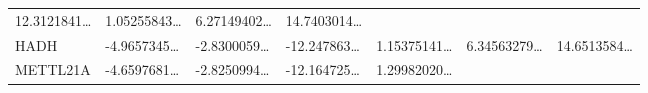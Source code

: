 \documentclass[
]{article}
\begin{document}
\begin{longtable}[]{@{}lllllll@{}}
\begin{minipage}[t]{0.12\columnwidth}
12.3121841\ldots{}\strut
\end{minipage} & \begin{minipage}[t]{0.12\columnwidth}\raggedright
1.05255843\ldots{}\strut
\end{minipage} & \begin{minipage}[t]{0.12\columnwidth}\raggedright
6.27149402\ldots{}\strut
\end{minipage} & \begin{minipage}[t]{0.12\columnwidth}\raggedright
14.7403014\ldots{}\strut
\end{minipage}\tabularnewline
\begin{minipage}[t]{0.08\columnwidth}\raggedright
HADH\strut
\end{minipage} & \begin{minipage}[t]{0.12\columnwidth}\raggedright
-4.9657345\ldots{}\strut
\end{minipage} & \begin{minipage}[t]{0.12\columnwidth}\raggedright
-2.8300059\ldots{}\strut
\end{minipage} & \begin{minipage}[t]{0.12\columnwidth}\raggedright
-12.247863\ldots{}\strut
\end{minipage} & \begin{minipage}[t]{0.12\columnwidth}\raggedright
1.15375141\ldots{}\strut
\end{minipage} & \begin{minipage}[t]{0.12\columnwidth}\raggedright
6.34563279\ldots{}\strut
\end{minipage} & \begin{minipage}[t]{0.12\columnwidth}\raggedright
14.6513584\ldots{}\strut
\end{minipage}\tabularnewline
\begin{minipage}[t]{0.08\columnwidth}\raggedright
METTL21A\strut
\end{minipage} & \begin{minipage}[t]{0.12\columnwidth}\raggedright
-4.6597681\ldots{}\strut
\end{minipage} & \begin{minipage}[t]{0.12\columnwidth}\raggedright
-2.8250994\ldots{}\strut
\end{minipage} & \begin{minipage}[t]{0.12\columnwidth}\raggedright
-12.164725\ldots{}\strut
\end{minipage} & \begin{minipage}[t]{0.12\columnwidth}\raggedright
1.29982020\ldots{}\strut

\end{minipage}
\end{longtable}
\end{document}
